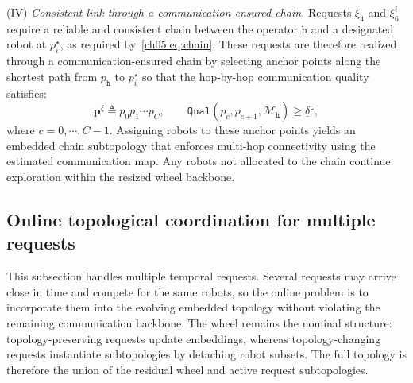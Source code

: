 (IV) \emph{Consistent link through a communication-ensured chain.}
Requests \(\xi_4\) and \(\xi_6^i\) require a reliable and
consistent chain between the operator \(\texttt{h}\) and a
designated robot at \(p_i^{\star}\), as required by~\eqref{ch05:eq:chain}.
These requests are therefore realized
through a communication-ensured chain by selecting anchor points
along the shortest path from \(p_{\texttt{h}}\) to \(p_i^{\star}\)
so that the hop-by-hop communication quality satisfies:
\begin{equation}
\label{ch05:eq:cec}
\mathbf{p}^{\xi}\triangleq p_0p_1\cdots p_C,
\qquad
\texttt{Qual}(p_c,p_{c+1},\mathcal{M}_{\texttt{h}})
\ge \underline{\delta}^{\texttt{c}},
\end{equation}
where \(c=0,\cdots,C-1\). Assigning robots to these anchor points
yields an embedded chain subtopology that enforces multi-hop
connectivity using the estimated communication map. Any robots not
allocated to the chain continue exploration within the resized wheel
backbone.































\subsection{Online topological coordination for multiple requests}
\label{ch05:subsec:online-requests}

This subsection handles multiple temporal requests. Several requests may arrive
close in time and compete for the same robots, so the online problem is to
incorporate them into the evolving embedded topology without violating the
remaining communication backbone. The wheel remains the nominal structure:
topology-preserving requests update embeddings, whereas topology-changing
requests instantiate subtopologies by detaching robot subsets. The full topology
is therefore the union of the residual wheel and active request subtopologies.

